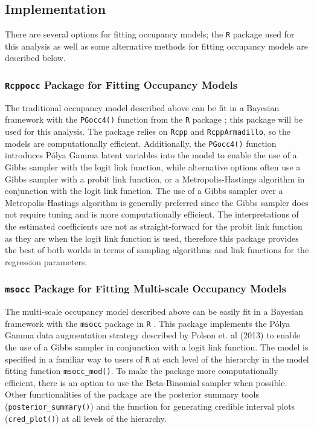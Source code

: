 \documentclass[12pt]{article}\usepackage[]{graphicx}\usepackage[]{color}
\begin{document}
\subsection{Implementation}

There are several options for fitting occupancy models; the \texttt{R} package used for this analysis as well as some alternative methods for fitting occupancy models are described below. 

\subsubsection{\texttt{Rcppocc} Package for Fitting Occupancy Models}

The traditional occupancy model described above can be fit in a Bayesian framework with the \texttt{PGocc4()} function from the \texttt{R} package  \cite{Rcppocc}; this package will be used for this analysis. The package relies on \texttt{Rcpp} and \texttt{RcppArmadillo}, so the models are computationally efficient. Additionally, the \texttt{PGocc4()} function introduces P\'{o}lya Gamma latent variables into the model to enable the use of a Gibbs sampler with the logit link function, while alternative options often use a Gibbs sampler with a probit link function, or a Metropolis-Hastings algorithm in conjunction with the logit link function. The use of a Gibbs sampler over a Metropolis-Hastings algorithm is generally preferred since the Gibbs sampler does not require tuning and is more computationally efficient. The interpretations of the estimated coefficients are not as straight-forward for the probit link function as they are when the logit link function is used, therefore this package provides the best of both worlds in terms of sampling algorithms and link functions for the regression parameters.  

\subsubsection{\texttt{msocc} Package for Fitting Multi-scale Occupancy Models}

The multi-scale occupancy model described above \cite{Dorazio_Erickson} can be easily fit in a Bayesian framework with the \texttt{msocc} package in \texttt{R} \cite{Stratton}. This package implements the P\'{o}lya Gamma data augmentation strategy described by Polson et. al (2013) to enable the use of a Gibbs sampler in conjunction with a logit link function. The model is specified in a familiar way to users of \texttt{R} at each level of the hierarchy in the model fitting function \texttt{msocc\_mod()}. To make the package more computationally efficient, there is an option to use the Beta-Binomial sampler when possible. Other functionalities of the package are the posterior summary tools (\texttt{posterior\_summary()}) and the function for generating credible interval plots (\texttt{cred\_plot()}) at all levels of the hierarchy. 
\end{document}
